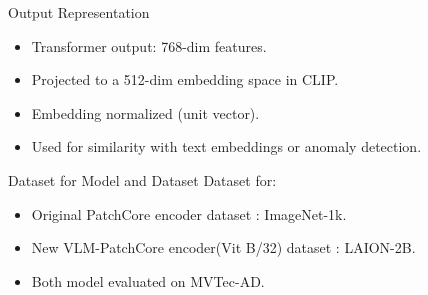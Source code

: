 \begin{frame}{Output Representation}
  \begin{itemize}
    \item Transformer output: 768-dim features.
    \item Projected to a 512-dim embedding space in CLIP.
    \item Embedding normalized (unit vector).
    \item Used for similarity with text embeddings or anomaly detection.
  \end{itemize}
\end{frame}
\begin{frame}{Dataset for Model and Dataset}
    Dataset for:
    \begin{itemize}
        \item Original PatchCore encoder dataset : ImageNet-1k.

        \item New VLM-PatchCore encoder(Vit B/32) dataset : LAION-2B.

        \item Both model evaluated on MVTec-AD.
    \end{itemize}
\end{frame}
